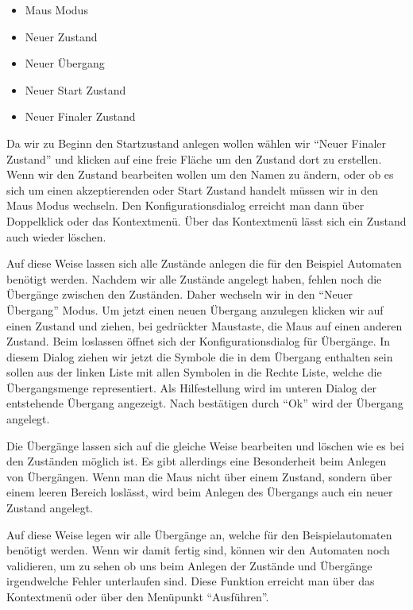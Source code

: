 \begin{itemize}
  \item Maus Modus
  \item Neuer Zustand
  \item Neuer Übergang
  \item Neuer Start Zustand
  \item Neuer Finaler Zustand
\end{itemize}

Da wir zu Beginn den Startzustand anlegen wollen wählen wir "`Neuer Finaler
Zustand"' und klicken auf eine freie Fläche um den Zustand dort zu erstellen.
Wenn wir den Zustand bearbeiten wollen um den Namen zu ändern, oder ob es sich
um einen akzeptierenden oder Start Zustand handelt müssen wir in den Maus Modus
wechseln. Den Konfigurationsdialog erreicht man dann über Doppelklick oder das
Kontextmenü. Über das Kontextmenü lässt sich ein Zustand auch wieder
löschen.\vspace{10pt}

Auf diese Weise lassen sich alle Zustände anlegen die für den Beispiel
Automaten benötigt werden. Nachdem wir alle Zustände angelegt haben, fehlen
noch die Übergänge zwischen den Zuständen. Daher wechseln wir in den "`Neuer
Übergang"' Modus. Um jetzt einen neuen Übergang anzulegen klicken wir auf einen
Zustand und ziehen, bei gedrückter Maustaste, die Maus auf einen anderen
Zustand. Beim loslassen öffnet sich der Konfigurationsdialog für Übergänge. In
diesem Dialog ziehen wir jetzt die Symbole die in dem Übergang enthalten
sein sollen aus der linken Liste mit allen Symbolen in die Rechte Liste, welche
die Übergangsmenge representiert. Als Hilfestellung wird im unteren Dialog der
entstehende Übergang angezeigt. Nach bestätigen durch "`Ok"' wird der
Übergang angelegt.\vspace{10pt}

Die Übergänge lassen sich auf die gleiche Weise bearbeiten und löschen wie
es bei den Zuständen möglich ist. Es gibt allerdings eine Besonderheit beim
Anlegen von Übergängen. Wenn man die Maus nicht über einem Zustand, sondern
über einem leeren Bereich loslässt, wird beim Anlegen des Übergangs auch ein
neuer Zustand angelegt.\vspace{10pt}

Auf diese Weise legen wir alle Übergänge an, welche für den Beispielautomaten
benötigt werden. Wenn wir damit fertig sind, können wir den Automaten noch
validieren, um zu sehen ob uns beim Anlegen der Zustände und Übergänge
irgendwelche Fehler unterlaufen sind. Diese Funktion
erreicht man über das Kontextmenü oder über den Menüpunkt "`Ausführen"'.

